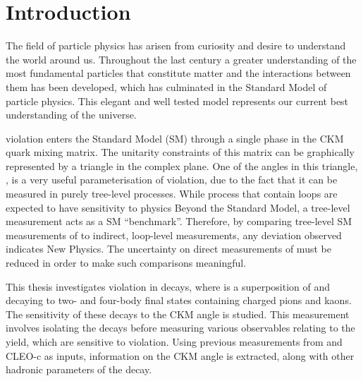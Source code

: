 %


\chapter{\label{ch:1-intro}Introduction} 

The field of particle physics has arisen from curiosity and desire to understand the world around us. Throughout the last century a greater understanding of the most fundamental particles that constitute matter and the interactions between them has been developed, which has culminated in the Standard Model of particle physics. This elegant and well tested model represents our current best understanding of the universe.

\CP violation enters the Standard Model (SM) through a single phase in the CKM quark mixing matrix. The unitarity constraints of this matrix can be graphically represented by a triangle in the complex plane. One of the angles in this triangle, \Pgamma, is a very useful parameterisation of \CP violation, due to the fact that it can be measured in purely tree-level processes. While process that contain loops are expected to have sensitivity to physics Beyond the Standard Model, a tree-level measurement acts as a SM ``benchmark''. Therefore, by comparing tree-level SM measurements of \Pgamma to indirect, loop-level measurements, any deviation observed indicates New Physics. The uncertainty on direct measurements of \Pgamma must be reduced in order to make such comparisons meaningful.

This thesis investigates \CP violation in \btodkst decays, where \D is a superposition of \Dz and \Dzb decaying to two- and four-body final states containing charged pions and kaons. The sensitivity of these decays to the CKM angle \Pgamma is studied. This measurement involves isolating the \btodkst decays before measuring various observables relating to the yield, which are sensitive to \CP violation. Using previous measurements from \lhcb and CLEO-c as inputs, information on the CKM angle \Pgamma is extracted, along with other hadronic parameters of the decay.

